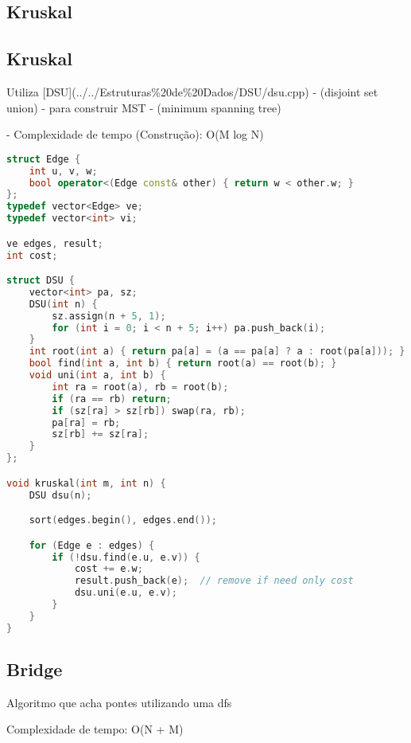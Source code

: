 \documentclass[11pt, a4paper, twoside]{article}
\begin{document}
\subsection{Kruskal}

\subsection{Kruskal}



Utiliza [DSU](../../Estruturas\%20de\%20Dados/DSU/dsu.cpp) - (disjoint set union) - para construir MST - (minimum spanning tree)

- Complexidade de tempo (Construção): O(M log N)

\begin{lstlisting}[language=C++]
struct Edge {
    int u, v, w;
    bool operator<(Edge const& other) { return w < other.w; }
};
typedef vector<Edge> ve;
typedef vector<int> vi;

ve edges, result;
int cost;

struct DSU {
    vector<int> pa, sz;
    DSU(int n) {
        sz.assign(n + 5, 1);
        for (int i = 0; i < n + 5; i++) pa.push_back(i);
    }
    int root(int a) { return pa[a] = (a == pa[a] ? a : root(pa[a])); }
    bool find(int a, int b) { return root(a) == root(b); }
    void uni(int a, int b) {
        int ra = root(a), rb = root(b);
        if (ra == rb) return;
        if (sz[ra] > sz[rb]) swap(ra, rb);
        pa[ra] = rb;
        sz[rb] += sz[ra];
    }
};

void kruskal(int m, int n) {
    DSU dsu(n);

    sort(edges.begin(), edges.end());

    for (Edge e : edges) {
        if (!dsu.find(e.u, e.v)) {
            cost += e.w;
            result.push_back(e);  // remove if need only cost
            dsu.uni(e.u, e.v);
        }
    }
}\end{lstlisting}

\subsection{Bridge}

Algoritmo que acha pontes utilizando uma dfs

Complexidade de tempo: O(N + M)
\end{document}

